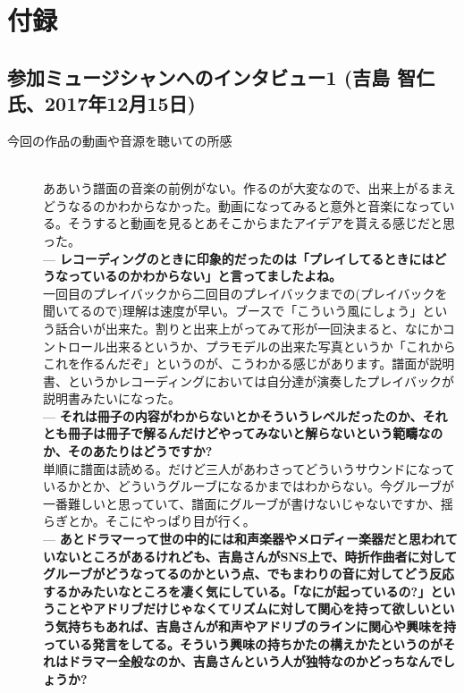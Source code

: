 \documentclass[uplatex,dvipdfmx]{ujarticle}
\begin{document}
\section{付録 \label{appendix}}
\subsection{参加ミュージシャンへのインタビュー1 (吉島 智仁氏、2017年12月15日)}

\begin{description}
 \item[今回の作品の動画や音源を聴いての所感]\mbox{}\\

 ああいう譜面の音楽の前例がない。作るのが大変なので、出来上がるまえどうなるのかわからなかった。動画になってみると意外と音楽になっている。そうすると動画を見るとあそこからまたアイデアを貰える感じだと思った。\\

 --- {\bf レコーディングのときに印象的だったのは「プレイしてるときにはどうなっているのかわからない」と言ってましたよね。}\\

 一回目のプレイバックから二回目のプレイバックまでの(プレイバックを聞いてるので)理解は速度が早い。ブースで「こういう風にしょう」という話合いが出来た。割りと出来上がってみて形が一回決まると、なにかコントロール出来るというか、プラモデルの出来た写真というか「これからこれを作るんだぞ」というのが、こうわかる感じがあります。譜面が説明書、というかレコーディングにおいては自分達が演奏したプレイバックが説明書みたいになった。\\

 --- {\bf それは冊子の内容がわからないとかそういうレベルだったのか、それとも冊子は冊子で解るんだけどやってみないと解らないという範疇なのか、そのあたりはどうですか?}\\

単順に譜面は読める。だけど三人があわさってどういうサウンドになっているかとか、どういうグルーブになるかまではわからない。今グルーブが一番難しいと思っていて、譜面にグルーブが書けないじゃないですか、揺らぎとか。そこにやっぱり目が行く。\\

--- {\bf あとドラマーって世の中的には和声楽器やメロディー楽器だと思われていないところがあるけれども、吉島さんがSNS上で、時折作曲者に対してグルーブがどうなってるのかという点、でもまわりの音に対してどう反応するかみたいなところを凄く気にしている。「なにが起っているの?」ということやアドリブだけじゃなくてリズムに対して関心を持って欲しいという気持ちもあれば、吉島さんが和声やアドリブのラインに関心や興味を持っている発言をしてる。そういう興味の持ちかたの構えかたというのがそれはドラマー全般なのか、吉島さんという人が独特なのかどっちなんでしょうか?}


\end{description}
\end{document}
